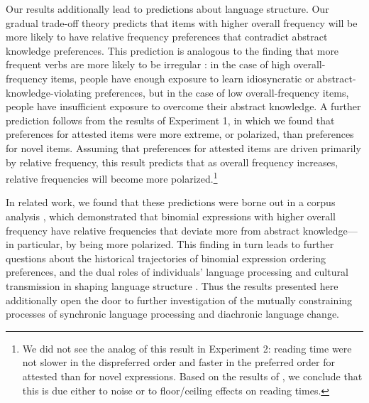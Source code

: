 \documentclass[authoryear]{elsarticle}
\begin{document}
Our results additionally lead to predictions about language structure. Our gradual trade-off theory predicts that items with higher overall frequency will be more likely to have relative frequency preferences that contradict abstract knowledge preferences. This prediction is analogous to the finding that more frequent verbs are more likely to be irregular \citep{Lieberman:2007bl}: in the case of high overall-frequency items, people have enough exposure to learn idiosyncratic or abstract-knowledge-violating preferences, but in the case of low overall-frequency items, people have insufficient exposure to overcome their abstract knowledge. A further prediction follows from the results of Experiment 1, in which we found that preferences for attested items were more extreme, or polarized, than preferences for novel items. Assuming that preferences for attested items are driven primarily by relative frequency, this result predicts that as overall frequency increases, relative frequencies will become more polarized.\footnote{We did not see the analog of this result in Experiment 2: reading time were not slower in the dispreferred order and faster in the preferred order for attested than for novel expressions. Based on the results of \citet{Morgan:2015to}, we conclude that this is due either to noise or to floor/ceiling effects on reading times.}

In related work, we found that these predictions were borne out in a corpus analysis \citep{Morgan:2015to}, which demonstrated that binomial expressions with higher overall frequency have relative frequencies that deviate more from abstract knowledge---in particular, by being more polarized. This finding in turn leads to further questions about the historical trajectories of binomial expression ordering preferences, and the dual roles of individuals' language processing and cultural transmission in shaping language structure \citep{Anonymous:GVZA8N7s}. Thus the results presented here additionally open the door to further investigation of the mutually constraining processes of synchronic language processing and diachronic language change.





\end{document}
